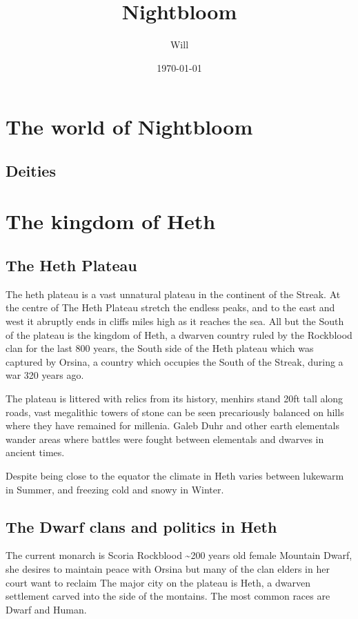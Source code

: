 \documentclass[10pt,twoside,twocolumn,openany,justified,bg=full,nomultitoc]{dndbook}
\author{Will}
\date{\today}
\title{Nightbloom}
\begin{document}
\maketitle
\tableofcontents
\chapter{The world of Nightbloom}
\label{sec-1}
\section{Deities}
\label{sec-1-1}



\chapter{The kingdom of Heth}
\label{sec-2}
\section{The Heth Plateau}
\label{sec-2-1}
The heth plateau is a vast unnatural plateau in the continent of the Streak. At the centre of The Heth Plateau stretch the endless peaks, and to the east and west it abruptly ends in cliffs miles high as it reaches the sea. All but the South of the plateau is the kingdom of Heth, a dwarven country ruled by the Rockblood clan for the last 800 years, the South side of the Heth plateau which was captured by Orsina, a country which occupies the South of the Streak, during a war 320 years ago. 

The plateau is littered with relics from its history, menhirs stand 20ft tall along roads, vast megalithic towers of stone can be seen precariously balanced on hills where they have remained for millenia. Galeb Duhr and other earth elementals wander areas where battles were fought between elementals and dwarves in ancient times.

Despite being close to the equator the climate in Heth varies between lukewarm in Summer, and freezing cold and snowy in Winter. 

\section{The Dwarf clans and politics in Heth}
\label{sec-2-2}
The current monarch is Scoria Rockblood \textasciitilde{}200 years old female Mountain Dwarf, she desires to maintain peace with Orsina but many of the clan elders in her court want to reclaim The major city on the plateau is Heth, a dwarven settlement carved into the side of the montains. The most common races are Dwarf and Human. 
\end{document}
